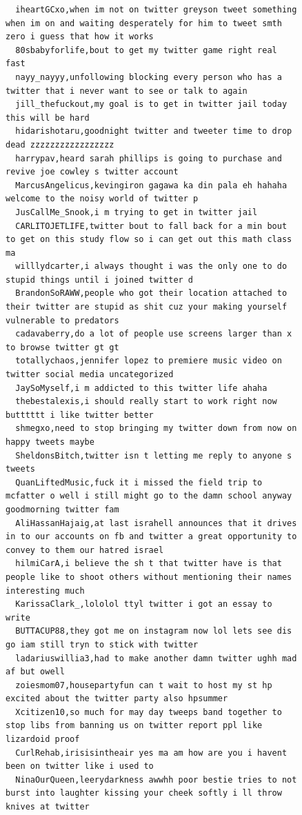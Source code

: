 \begin{figure}[htpb]
\begin{verbatim}
  iheartGCxo,when im not on twitter greyson tweet something when im on and waiting desperately for him to tweet smth zero i guess that how it works
  80sbabyforlife,bout to get my twitter game right real fast
  nayy_nayyy,unfollowing blocking every person who has a twitter that i never want to see or talk to again
  jill_thefuckout,my goal is to get in twitter jail today this will be hard
  hidarishotaru,goodnight twitter and tweeter time to drop dead zzzzzzzzzzzzzzzzz
  harrypav,heard sarah phillips is going to purchase and revive joe cowley s twitter account
  MarcusAngelicus,kevingiron gagawa ka din pala eh hahaha welcome to the noisy world of twitter p
  JusCallMe_Snook,i m trying to get in twitter jail
  CARLITOJETLIFE,twitter bout to fall back for a min bout to get on this study flow so i can get out this math class ma
  willlydcarter,i always thought i was the only one to do stupid things until i joined twitter d
  BrandonSoRAWW,people who got their location attached to their twitter are stupid as shit cuz your making yourself vulnerable to predators
  cadavaberry,do a lot of people use screens larger than x to browse twitter gt gt
  totallychaos,jennifer lopez to premiere music video on twitter social media uncategorized
  JaySoMyself,i m addicted to this twitter life ahaha
  thebestalexis,i should really start to work right now butttttt i like twitter better
  shmegxo,need to stop bringing my twitter down from now on happy tweets maybe
  SheldonsBitch,twitter isn t letting me reply to anyone s tweets
  QuanLiftedMusic,fuck it i missed the field trip to mcfatter o well i still might go to the damn school anyway goodmorning twitter fam
  AliHassanHajaig,at last israhell announces that it drives in to our accounts on fb and twitter a great opportunity to convey to them our hatred israel
  hilmiCarA,i believe the sh t that twitter have is that people like to shoot others without mentioning their names interesting much
  KarissaClark_,lololol ttyl twitter i got an essay to write
  BUTTACUP88,they got me on instagram now lol lets see dis go iam still tryn to stick with twitter
  ladariuswillia3,had to make another damn twitter ughh mad af but owell
  zoiesmom07,housepartyfun can t wait to host my st hp excited about the twitter party also hpsummer
  Xcitizen10,so much for may day tweeps band together to stop libs from banning us on twitter report ppl like lizardoid proof
  CurlRehab,irisisintheair yes ma am how are you i havent been on twitter like i used to
  NinaOurQueen,leerydarkness awwhh poor bestie tries to not burst into laughter kissing your cheek softly i ll throw knives at twitter

\end{verbatim}
\end{figure}
